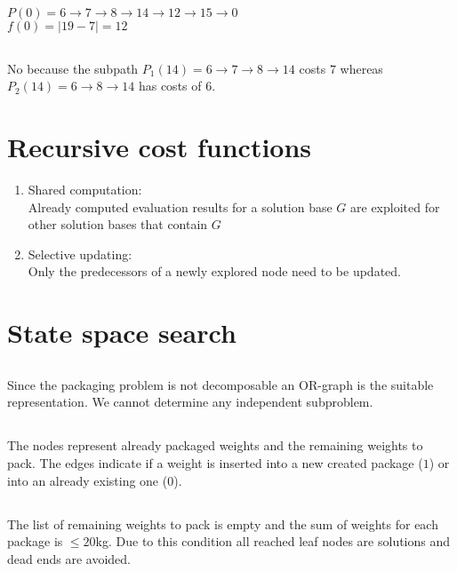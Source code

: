 \documentclass[11pt]{article}
\begin{document}
\subsection{}
$P(0)= 6\rightarrow 7\rightarrow 8\rightarrow 14\rightarrow 12\rightarrow 15 \rightarrow 0$\\
$f(0) = |19-7| = 12$

\subsection{}
No because the subpath $P_1(14)=6\rightarrow 7 \rightarrow 8 \rightarrow 14$ costs $7$ whereas $P_2(14)= 6 \rightarrow 8 \rightarrow 14$ has costs of $6$.

\section{Recursive cost functions}
\begin{enumerate}
	\item Shared computation:\\
	\indent Already computed evaluation results for a solution base $G$ are exploited for other solution bases that contain $G$
	\item Selective updating:\\
	\indent Only the predecessors of a newly explored node need to be updated.
\end{enumerate}
\section{State space search}
\subsection{}
Since the packaging problem is not decomposable an OR-graph is the suitable representation. We cannot determine any independent subproblem.

\subsection{}
The nodes represent already packaged weights and the remaining weights to pack. The edges indicate if a weight is inserted into a new created package ($1$) or into an already existing one ($0$).

\subsection{}
The list of remaining weights to pack is empty and the sum of weights for each package is $\leq 20$kg. Due to this condition all reached leaf nodes are solutions and dead ends are avoided.
\end{document}
